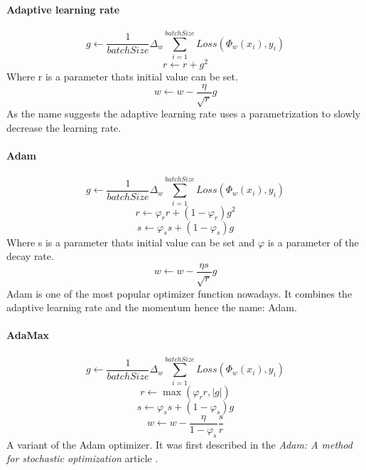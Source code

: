 \paragraph*{Adaptive learning rate}
\[g \leftarrow \frac{1}{batchSize}\Delta_w \sum_{i=1}^{batchSize}Loss(\Phi_w(x_i), y_i)\]
\[r \leftarrow r + g^2\]
Where r is a parameter thats initial value can be set.
\[w \leftarrow w - \frac{\eta}{\sqrt{r}} g\]
As the name suggests the adaptive learning rate uses a parametrization to slowly decrease the learning rate.

\paragraph*{Adam}
\[g \leftarrow \frac{1}{batchSize}\Delta_w \sum_{i=1}^{batchSize}Loss(\Phi_w(x_i), y_i)\]
\[r \leftarrow \varphi_r r + (1 - \varphi_r) g^2\]
\[s \leftarrow \varphi_s s + (1 - \varphi_s) g\]
Where s is a parameter thats initial value can be set and \(\varphi\) is a parameter of the decay rate.
\[w \leftarrow w - \frac{\eta s}{\sqrt{r}} g\]
Adam is one of the most popular optimizer function nowadays. It combines the adaptive learning rate and the momentum hence the name: Adam.

\paragraph*{AdaMax}
\[g \leftarrow \frac{1}{batchSize}\Delta_w \sum_{i=1}^{batchSize}Loss(\Phi_w(x_i), y_i)\]
\[r \leftarrow \max(\varphi_r r, |g|)\]
\[s \leftarrow \varphi_s s + (1 - \varphi_s) g\]
\[w \leftarrow w - \frac{\eta}{1 - \varphi_s}\frac{s}{r}\]
A variant of the Adam optimizer. It was first described in the \textit{Adam: A method for stochastic optimization} article \cite{Kingma:2015}.

